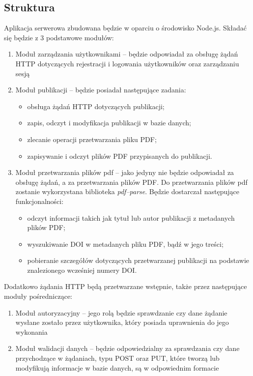 \documentclass[a4paper,12pt,twoside,openany]{report}
\begin{document}
\subsection{Struktura}
Aplikacja serwerowa zbudowana będzie w oparciu o środowisko Node.js. Składać się będzie z 3 podstawowe modułów:
\begin{enumerate}
	\item Moduł zarządzania użytkownikami -- będzie odpowiadał za obsługę żądań HTTP dotyczących rejestracji i logowania użytkowników oraz zarządzaniu sesją
	
	\item Moduł publikacji -- będzie posiadał następujące zadania:
	\begin{itemize}
		\item obsługa żądań HTTP dotyczących publikacji;
		\item zapis, odczyt i modyfikacja publikacji w bazie danych;
		\item zlecanie operacji przetwarzania pliku PDF;
		\item zapisywanie i odczyt plików PDF przypisanych do publikacji.
	\end{itemize}
	 
	\item Moduł przetwarzania plików pdf -- jako jedyny nie będzie odpowiadał za obsługę żądań, a za przetwarzania plików PDF. Do przetwarzania plików pdf zostanie wykorzystana biblioteka \textit{pdf--parse}. Będzie dostarczał następujące funkcjonalności:
	\begin{itemize}
		\item odczyt informacji takich jak tytuł lub autor publikacji z metadanych plików PDF;
		\item wyszukiwanie DOI w metadanych pliku PDF, bądź w jego treści;
		\item pobieranie szczegółów dotyczących przetwarzanej publikacji na podstawie znalezionego wcześniej numery DOI.
	\end{itemize}
\end{enumerate}


Dodatkowo żądania HTTP będą przetwarzane wstępnie, także przez następujące moduły pośredniczące:
\begin{enumerate}
	\item Moduł autoryzacyjny -- jego rolą będzie sprawdzanie czy dane żądanie wysłane zostało przez użytkownika, który posiada uprawnienia do jego wykonania
	\item Moduł walidacji danych -- będzie odpowiedzialny za sprawdzania czy dane przychodzące w żądaniach, typu POST oraz PUT, które tworzą lub modyfikują informacje w bazie danych, są w odpowiednim formacie
\end{enumerate}
\end{document}
